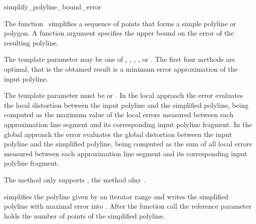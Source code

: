 

\begin{ccRefFunction}{simplify_polyline_bound_error}

\ccDefinition
  
The function \ccRefName\ simplifies a
sequence of points that forms a simple polyline or polygon. A
function argument specifies the upper bound on the error of the
resulting polyline.

The template parameter  may be one of
, ,
, , or
.  The first four methods are optimal, that is
the obtained result is a minimum error approximation of the input
polyline.

The template parameter  must be  or .
In the local approach the error evaluates the local
distortion between the input polyline and the simplified polyline,
being computed as the maximum value of the local errors measured
between each approximation line segment and its corresponding input
polyline fragment.
In the global approach the error evaluates the
global distortion between the input polyline and the simplified
polyline, being computed as the sum of all local errors measured
between each approximation line segment and its corresponding input
polyline fragment.

The  method only supports ,
the  method olny .



            {simplifies the polyline given by an iterator range and writes the simplified
             polyline with maximal error  into . After the function call 
             the reference parameter  holds the number of points of
             the simplified polyline.}




\end{ccRefFunction}
